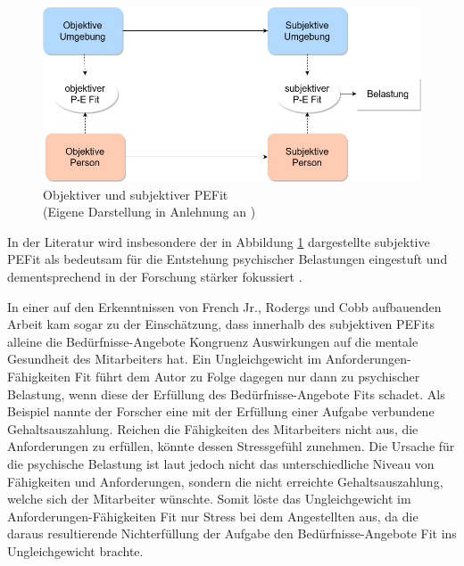 \begin{figure}[h]
	\centering
	\includegraphics[width=1\textwidth]{gfx/subjektivObjektivPEFit.jpg}
	\caption[Objektiver und subjektiver \acs{PEFit}]{Objektiver und subjektiver \acs{PEFit}\\
	(Eigene Darstellung in Anlehnung an \cite[S. 2]{harrison:1978})}
	\label{fig:personEnvironmentFit:subjektivObjektiv:abb1}
\end{figure}

In der Literatur wird insbesondere der in Abbildung \ref{fig:personEnvironmentFit:subjektivObjektiv:abb1} dargestellte subjektive \ac{PEFit} als bedeutsam für die Entstehung psychischer Belastungen eingestuft und dementsprechend in der Forschung stärker fokussiert \cite[S. 8]{caplan:1987}\cite[S. 9]{caplan:1993}\cite[S. 3]{carless:2005}\cite[S. 8f.]{su:2015}.

In einer auf den Erkenntnissen von French Jr., Rodergs und Cobb aufbauenden Arbeit kam \textcite[S. 5ff.]{harrison:1978} sogar zu der Einschätzung, dass innerhalb des subjektiven \acp{PEFit} alleine die Bedürfnisse-Angebote Kongruenz Auswirkungen auf die mentale Gesundheit des Mitarbeiters hat. Ein Ungleichgewicht im Anforderungen-Fähigkeiten Fit führt dem Autor zu Folge dagegen nur dann zu psychischer Belastung, wenn diese der Erfüllung des Bedürfnisse-Angebote Fits schadet. Als Beispiel nannte der Forscher eine mit der Erfüllung einer Aufgabe verbundene Gehaltsauszahlung. Reichen die Fähigkeiten des Mitarbeiters nicht aus, die Anforderungen zu erfüllen, könnte dessen Stressgefühl zunehmen. Die Ursache für die psychische Belastung ist laut \textcite[S. 7f.]{harrison:1978} jedoch nicht das unterschiedliche Niveau von Fähigkeiten und Anforderungen, sondern die nicht erreichte Gehaltsauszahlung, welche sich der Mitarbeiter wünschte. Somit löste das Ungleichgewicht im Anforderungen-Fähigkeiten Fit nur Stress bei dem Angestellten aus, da die daraus resultierende Nichterfüllung der Aufgabe den Bedürfnisse-Angebote Fit ins Ungleichgewicht brachte.

